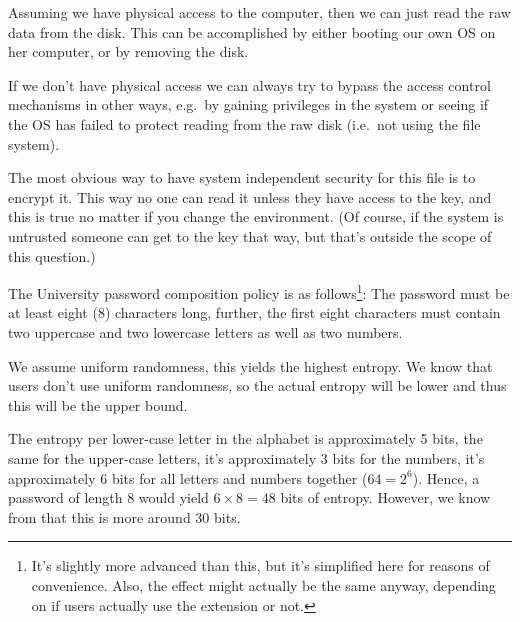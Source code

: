 \documentclass[svv,addpoints]{miunexam}
\begin{document}
\begin{questions}
\begin{solution}
    Assuming we have physical access to the computer, then we can just read the 
    raw data from the disk.
    This can be accomplished by either booting our own OS on her computer, or 
    by removing the disk.

    If we don't have physical access we can always try to bypass the access 
    control mechanisms in other ways, e.g.\ by gaining privileges in the system 
    or seeing if the OS has failed to protect reading from the raw disk (i.e.\ 
    not using the file system).

    The most obvious way to have system independent security for this file is 
    to encrypt it.
    This way no one can read it unless they have access to the key, and this is 
    true no matter if you change the environment.
    (Of course, if the system is untrusted someone can get to the key that way, 
    but that's outside the scope of this question.)
  \end{solution}


  \question\label{q:infogain}
  The University password composition policy is as follows\footnote{%
    It's slightly more advanced than this, but it's simplified here for reasons 
    of convenience.
    Also, the effect might actually be the same anyway, depending on if users 
    actually use the extension or not.
  }:
  The password must be at least eight (8) characters long, further, the first 
  eight characters must contain two uppercase and two lowercase letters as well 
  as two numbers.

  \begin{solution}
    We assume uniform randomness, this yields the highest entropy.
    We know that users don't use uniform randomness, so the actual entropy will 
    be lower and thus this will be the upper bound.

    The entropy per lower-case letter in the alphabet is approximately 5 bits, 
    the same for the upper-case letters, it's approximately 3 bits for the 
    numbers, it's approximately 6 bits for all letters and numbers together 
    (\(64 = 2^6\)).
    Hence, a password of length 8 would yield \(6\times 8 = 48\) bits of 
    entropy.
    However, we know from \cite{Komanduri2011opa} that this is more around 30 
    bits.


\end{solution}
\end{questions}
\end{document}

